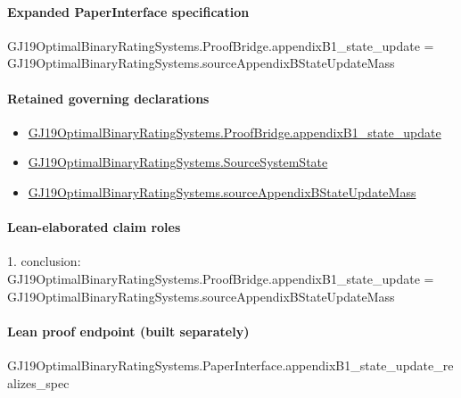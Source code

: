 \documentclass[10pt]{article}
\begin{document}
\paragraph{Expanded PaperInterface specification}
\begin{ReviewVerbatim}
GJ19OptimalBinaryRatingSystems.ProofBridge.appendixB1_state_update =
  GJ19OptimalBinaryRatingSystems.sourceAppendixBStateUpdateMass
\end{ReviewVerbatim}

\paragraph{Retained governing declarations}
\begin{itemize}\raggedright
\item \hyperlink{governing-declaration-014d983982300e24}{GJ19\allowbreak{}Optimal\allowbreak{}Binary\allowbreak{}Rating\allowbreak{}Systems.\allowbreak{}Proof\allowbreak{}Bridge.\allowbreak{}appendix\allowbreak{}B1\_\allowbreak{}state\_\allowbreak{}update}
\item \hyperlink{paper-prerequisite-f367c7dfa94eb0ae}{GJ19\allowbreak{}Optimal\allowbreak{}Binary\allowbreak{}Rating\allowbreak{}Systems.\allowbreak{}Source\allowbreak{}System\allowbreak{}State}
\item \hyperlink{governing-declaration-8ce41bb3dc48a62c}{GJ19\allowbreak{}Optimal\allowbreak{}Binary\allowbreak{}Rating\allowbreak{}Systems.\allowbreak{}source\allowbreak{}Appendix\allowbreak{}B\allowbreak{}State\allowbreak{}Update\allowbreak{}Mass}
\end{itemize}
\paragraph{Lean-elaborated claim roles}\begin{ReviewVerbatim}
1. conclusion: GJ19OptimalBinaryRatingSystems.ProofBridge.appendixB1_state_update =
  GJ19OptimalBinaryRatingSystems.sourceAppendixBStateUpdateMass
\end{ReviewVerbatim}

\paragraph{Lean proof endpoint (built separately)}\begin{ReviewVerbatim}
GJ19OptimalBinaryRatingSystems.PaperInterface.appendixB1_state_update_realizes_spec
\end{ReviewVerbatim}
\end{document}
